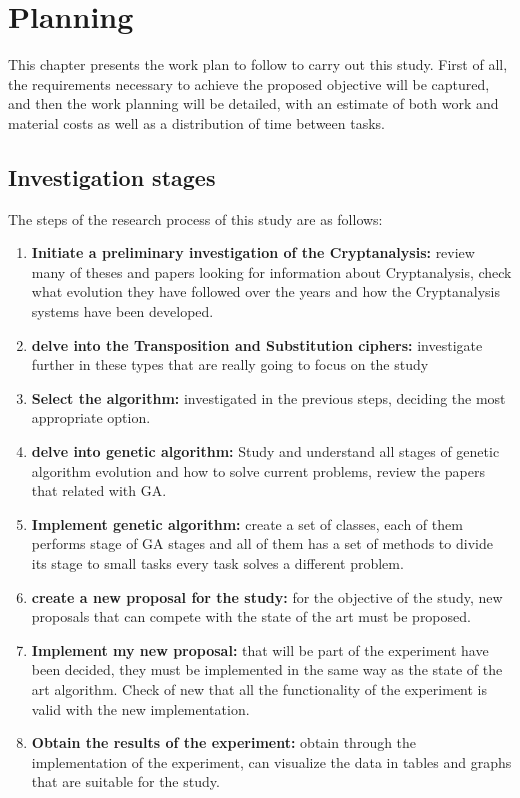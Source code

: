 \chapter{Planning}

This chapter presents the work plan to follow to carry out this study. First of all, the requirements necessary to achieve the proposed objective will be captured, and then the work planning will be detailed, with an estimate of both work and material costs as well as a distribution of time between tasks.

\section{Investigation stages}
The steps of the research process of this study are as follows:

\begin{enumerate}
    \item{\textbf{Initiate a preliminary investigation of the Cryptanalysis:} review many of theses and papers looking for information about Cryptanalysis, check what evolution they have followed over the years and how the Cryptanalysis systems have been developed.}
    \item{\textbf{delve into the Transposition and Substitution ciphers:} investigate further in these types that are really going to focus on the study}
    \item {\textbf{Select the algorithm:} investigated in the previous steps, deciding the most appropriate option.}
    \item {\textbf{delve into genetic algorithm:} Study and understand all stages of genetic algorithm evolution and how to solve current problems, review the papers that related with GA.}
    \item {\textbf{Implement genetic algorithm:} create a set of classes, each of them performs stage of GA stages and all of them has a set of methods to divide its stage to small tasks every task solves a different problem.}
    \item {\textbf{create a new proposal for the study:} for the objective of the study, new proposals that can compete with the state of the art must be proposed.}
    \item {\textbf{Implement my new proposal:} that will be part of the experiment have been decided, they must be implemented in the same way as the state of the art algorithm. Check of new that all the functionality of the experiment is valid with the new implementation.}
    \item {\textbf{Obtain the results of the experiment:} obtain through the implementation of the experiment, can visualize the data in tables and graphs that are suitable for the study.}

\end{enumerate}
